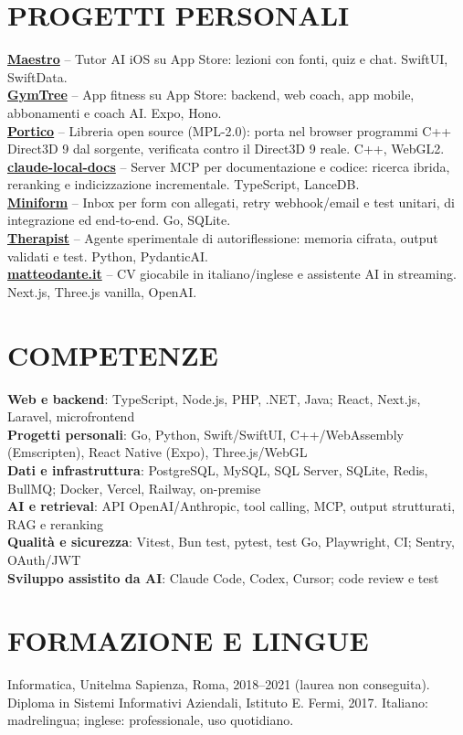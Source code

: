 \documentclass[a4paper,10pt]{article}
\renewcommand{\small}{\fontsize{10}{12}\selectfont}
\begin{document}
\section{PROGETTI PERSONALI}
\small
\textbf{\href{https://apps.apple.com/it/app/maestro-impara-tutto/id6780267046?uo=4}{Maestro}} -- Tutor AI iOS su App Store: lezioni con fonti, quiz e chat. SwiftUI, SwiftData.\\[3pt]
\textbf{\href{https://apps.apple.com/it/app/gymtree-palestra-coach-ai/id6761392403?uo=4}{GymTree}} -- App fitness su App Store: backend, web coach, app mobile, abbonamenti e coach AI. Expo, Hono.\\[3pt]
\textbf{\href{https://github.com/matteodante/portico}{Portico}} -- Libreria open source (MPL-2.0): porta nel browser programmi C++ Direct3D 9 dal sorgente, verificata contro il Direct3D 9 reale. C++, WebGL2.\\[3pt]
\textbf{\href{https://github.com/matteodante/claude-local-docs}{claude-local-docs}} -- Server MCP per documentazione e codice: ricerca ibrida, reranking e indicizzazione incrementale. TypeScript, LanceDB.\\[3pt]
\textbf{\href{https://github.com/matteodante/miniform}{Miniform}} -- Inbox per form con allegati, retry webhook/email e test unitari, di integrazione ed end-to-end. Go, SQLite.\\[3pt]
\textbf{\href{https://github.com/matteodante/therapist}{Therapist}} -- Agente sperimentale di autoriflessione: memoria cifrata, output validati e test. Python, PydanticAI.\\[3pt]
\textbf{\href{https://matteodante.it}{matteodante.it}} -- CV giocabile in italiano/inglese e assistente AI in streaming. Next.js, Three.js vanilla, OpenAI.
\section{COMPETENZE}
\small
\textbf{Web e backend}: TypeScript, Node.js, PHP, .NET, Java; React, Next.js, Laravel, microfrontend\\[2pt]
\textbf{Progetti personali}: Go, Python, Swift/SwiftUI, C++/WebAssembly (Emscripten), React Native (Expo), Three.js/WebGL\\[2pt]
\textbf{Dati e infrastruttura}: PostgreSQL, MySQL, SQL Server, SQLite, Redis, BullMQ; Docker, Vercel, Railway, on-premise\\[2pt]
\textbf{AI e retrieval}: API OpenAI/Anthropic, tool calling, MCP, output strutturati, RAG e reranking\\[2pt]
\textbf{Qualità e sicurezza}: Vitest, Bun test, pytest, test Go, Playwright, CI; Sentry, OAuth/JWT\\[2pt]
\textbf{Sviluppo assistito da AI}: Claude Code, Codex, Cursor; code review e test
\section{FORMAZIONE E LINGUE}
\small
Informatica, Unitelma Sapienza, Roma, 2018--2021 (laurea non conseguita).\\[2pt]
Diploma in Sistemi Informativi Aziendali, Istituto E. Fermi, 2017. Italiano: madrelingua; inglese: professionale, uso quotidiano.
\end{document}
